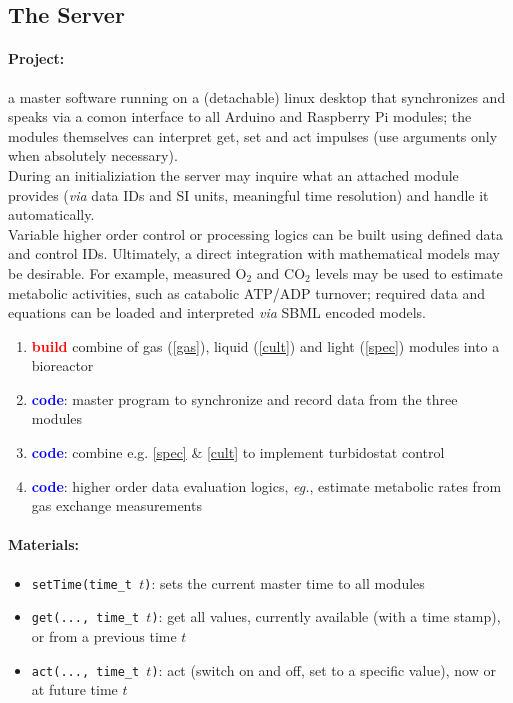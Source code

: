 \documentclass[12pt,a4paper]{scrartcl}
\newcommand{\build}[0]{\textcolor{red}{\textbf{build}}}
\newcommand{\code}[0]{\textcolor{blue}{\textbf{code}}}
\newcommand{\ox}[0]{O$_2$}
\newcommand{\cox}[0]{CO$_2$}
\begin{document}
\clearpage
\subsection{The Server}
\paragraph{Project:} a master software running on a (detachable) linux 
desktop that synchronizes and speaks via a comon interface to all
Arduino and Raspberry Pi modules; the modules themselves can interpret
get, set and act impulses (use arguments only when absolutely
necessary).\\ During an initializiation the server may inquire what an
attached module provides (\textit{via} data IDs and SI units,
meaningful time resolution) and handle it automatically. \\ Variable
higher order control or processing logics can be built using defined
data and control IDs. Ultimately, a direct integration with
mathematical models may be desirable.  For example, measured \ox{} and
\cox{} levels may be used to estimate metabolic activities, such as
catabolic ATP/ADP turnover; required data and equations can be loaded
and interpreted \textit{via} SBML encoded models.
\begin{enumerate}
\item \build{} combine of gas (\ref{gas}), liquid (\ref{cult})
  and light (\ref{spec}) modules into a bioreactor
\item \code{}: master program to synchronize and record data from
  the three modules
\item \code{}: combine e.g. \ref{spec} \& \ref{cult} to implement
  turbidostat control
\item \code{}: higher order data evaluation logics, \textit{eg.}, estimate
  metabolic rates from gas exchange measurements
\end{enumerate}


\paragraph{Materials:}
\begin{itemize}
\item \texttt{setTime(time\_t $t$)}: sets the current master time to
  all modules
\item \texttt{get(..., time\_t $t$)}: get all values, currently
  available (with a time stamp), or from a previous time $t$
\item \texttt{act(..., time\_t $t$)}: act (switch on and off, set to a
  specific value), now or at future time $t$
\end{itemize}
\end{document}
